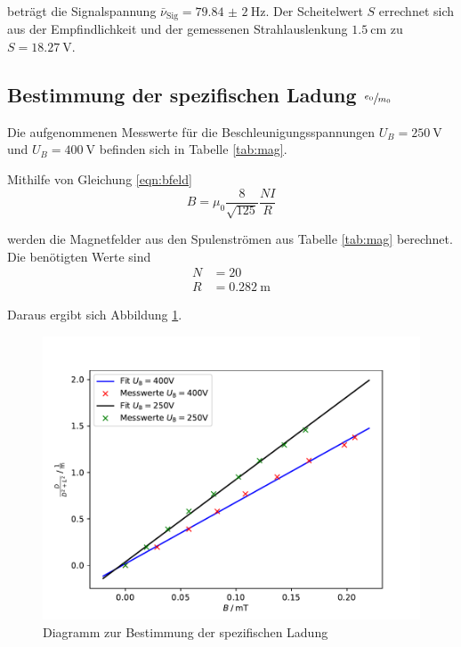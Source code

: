 beträgt die Signalspannung $\bar{\nu}_\text{Sig} = \SI{79,84(2)}{\Hz}$.
Der Scheitelwert $S$ errechnet sich aus der Empfindlichkeit und der gemessenen Strahlauslenkung $\SI{1,5}{\cm}$ zu $S = \SI{18,27}{\V}$.

\subsection{Bestimmung der spezifischen Ladung $\sfrac{e_0}{m_0}$ \label{sec:spez}}

Die aufgenommenen Messwerte für die Beschleunigungsspannungen $U_B = \SI{250}{\V}$ und $U_B = \SI{400}{\V}$ befinden sich
in Tabelle \ref{tab:mag}.


Mithilfe von Gleichung \eqref{eqn:bfeld}
\begin{equation}
  B = \mu_0 \frac{8}{\sqrt{125}} \frac{N I}{R}
  \label{eqn:bfeld}
\end{equation}

werden die Magnetfelder aus den Spulenströmen aus Tabelle \ref{tab:mag} berechnet. Die benötigten Werte sind
\begin{align*}
  N &= 20 \\
  R &= \SI{0,282}{\m}
\end{align*}

Daraus ergibt sich Abbildung \ref{fig:mag}.
\begin{figure}[H]
  \centering
  \includegraphics[width=\textwidth]{Plots/magnet.pdf}
  \caption{Diagramm zur Bestimmung der spezifischen Ladung}
  \label{fig:mag}
\end{figure}

